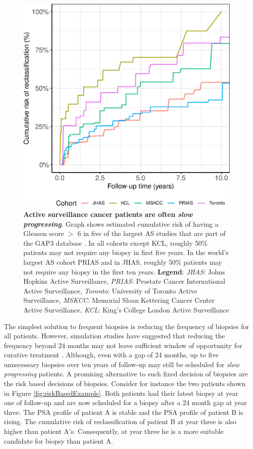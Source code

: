 \begin{figure}[!htb]
\centerline{\includegraphics[width=\columnwidth]{images/npmle_plot.eps}}
\caption{\textbf{Active surveillance cancer patients are often \textit{slow progressing}}. Graph shows estimated cumulative risk of having a Gleason score $>$ 6 in five of the largest AS studies that are part of the GAP3 database \citep{gap3_2018}. In all cohorts except KCL, roughly 50\% patients may not require any biopsy in first five years. In the world's largest AS cohort PRIAS and in JHAS, roughly 50\% patients may not require any biopsy in the first ten years. \textbf{Legend}: \textit{JHAS}: Johns Hopkins Active Surveillance, \textit{PRIAS}: Prostate Cancer International Active Surveillance, \textit{Toronto}: University of Toronto Active Surveillance, \textit{MSKCC}: Memorial Sloan Kettering Cancer Center Active Surveillance, \textit{KCL}: King's College London Active Surveillance}
\label{fig:npmle_plot}
\end{figure}

The simplest solution to frequent biopsies is reducing the frequency of biopsies for all patients. However, simulation studies have suggested that reducing the frequency beyond 24 months may not leave sufficient window of opportunity for curative treatment \citep{inoue2018comparative}. Although, even with a gap of 24 months, up to five unnecessary biopsies over ten years of follow-up may still be scheduled for \textit{slow progressing} patients. A promising alternative to such fixed decision of biopsies are the risk based decisions of biopsies. Consider for instance the two patients shown in Figure \ref{fig:riskBasedExample}. Both patients had their latest biopsy at year one of follow-up and are now scheduled for a biopsy after a 24 month gap at year three. The PSA profile of patient A is stable and the PSA profile of patient B is rising. The cumulative risk of reclassification of patient B at year three is also higher than patient A's. Consequently, at year three he is a more suitable candidate for biopsy than patient A.

